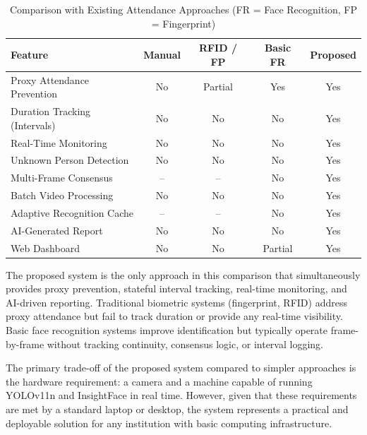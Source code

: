 \documentclass{report}
\begin{document}
\begin{table}[H]
\centering
\begin{tabular}{|l|c|c|c|c|}
\hline
\textbf{Feature} & \textbf{Manual} & \textbf{RFID / FP} & \textbf{Basic FR} & \textbf{Proposed} \\
\hline
Proxy Attendance Prevention & No & Partial & Yes & Yes \\
\hline
Duration Tracking (Intervals) & No & No & No & Yes \\
\hline
Real-Time Monitoring & No & No & No & Yes \\
\hline
Unknown Person Detection & No & No & No & Yes \\
\hline
Multi-Frame Consensus & -- & -- & No & Yes \\
\hline
Batch Video Processing & No & No & No & Yes \\
\hline
Adaptive Recognition Cache & -- & -- & No & Yes \\
\hline
AI-Generated Report & No & No & No & Yes \\
\hline
Web Dashboard & No & No & Partial & Yes \\
\hline
\end{tabular}
\caption{Comparison with Existing Attendance Approaches (FR = Face Recognition, FP = Fingerprint)}
\label{tab:comparison}
\end{table}

The proposed system is the only approach in this comparison that simultaneously provides proxy\vspace{3pt} prevention, stateful interval tracking, real-time monitoring, and AI-driven reporting. Traditional\vspace{3pt} biometric systems (fingerprint, RFID) address proxy attendance but fail to track duration or\vspace{3pt} provide any real-time visibility. Basic face recognition systems improve identification but typically\vspace{3pt} operate frame-by-frame without tracking continuity, consensus logic, or interval logging.

The primary trade-off of the proposed system compared to simpler approaches is the hardware\vspace{3pt} requirement: a camera and a machine capable of running YOLOv11n and InsightFace in real time.\vspace{3pt} However, given that these requirements are met by a standard laptop or desktop, the system\vspace{3pt} represents a practical and deployable solution for any institution with basic computing infrastructure.
\end{document}

